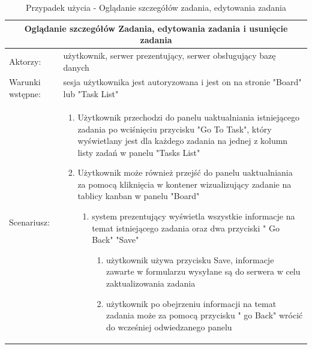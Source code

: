\begin{table}[h!]
	
	\begin{tabular}{ |p{2cm}||p{13cm}|  }
		
		\hline
		\multicolumn{2}{|c|}{Oglądanie szczegółów Zadania, edytowania zadania i usunięcie zadania} \\
		\hline
		Aktorzy: &użytkownik, serwer prezentujący, serwer obsługujący bazę danych\\
		\hline
		Warunki wstępne: & sesja użytkownika jest autoryzowana i jest on na stronie "Board" lub "Task List"\\
		\hline
		Scenariusz: &
		
		\begin{enumerate}
			
			
			\item Użytkownik przechodzi do panelu uaktualniania istniejącego zadania po wciśnięciu przycisku "Go To Task", który wyświetlany jest dla każdego zadania na jednej z kolumn listy zadań w panelu "Tasks List" 
			\item Użytkownik może również przejść do panelu uaktualniania za pomocą kliknięcia w kontener wizualizujący zadanie na tablicy kanban w panelu "Board"
			\begin{enumerate}
				\item system prezentujący wyświetla wszystkie informacje na temat istniejącego zadania oraz dwa przyciski " Go Back" "Save"
				
				\begin{enumerate}
					\item użytkownik używa przycisku Save, informacje zawarte w formularzu wysyłane są do serwera w celu zaktualizowania zadania
					
					\item użytkownik po obejrzeniu informacji na temat zadania może za pomocą przycisku " go Back" wrócić do wcześniej odwiedzanego panelu
				\end{enumerate}
			\end{enumerate}
		\end{enumerate}\\
		\hline
	\end{tabular}
	\caption{Przypadek użycia - Oglądanie szczegółów zadania, edytowania zadania}
\end{table}

